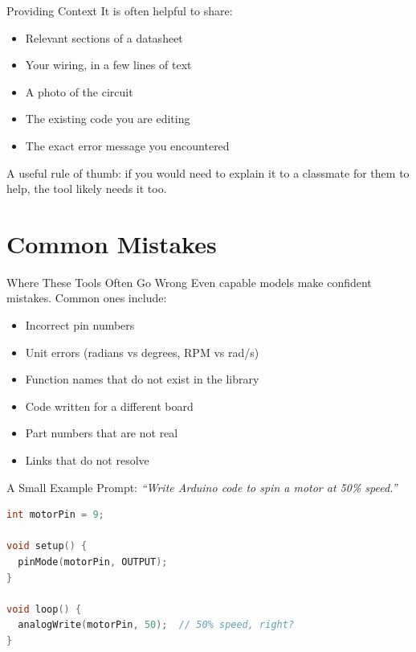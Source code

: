 \documentclass[aspectratio=169,11pt]{beamer}
\begin{document}
\begin{frame}{Providing Context}
  It is often helpful to share:
  \vfill
  \begin{itemize}
    \setlength\itemsep{0.4em}
    \item Relevant sections of a datasheet
    \item Your wiring, in a few lines of text
    \item A photo of the circuit
    \item The existing code you are editing
    \item The exact error message you encountered
  \end{itemize}
  \vfill
  A useful rule of thumb: if you would need to explain it to a classmate for them to help, the tool likely needs it too.
\end{frame}

\section{Common Mistakes}

\begin{frame}{Where These Tools Often Go Wrong}
  Even capable models make confident mistakes. Common ones include:
  \vfill
  \begin{itemize}
    \setlength\itemsep{0.4em}
    \item Incorrect pin numbers
    \item Unit errors (radians vs degrees, RPM vs rad/s)
    \item Function names that do not exist in the library
    \item Code written for a different board
    \item Part numbers that are not real
    \item Links that do not resolve
  \end{itemize}
\end{frame}

\begin{frame}[fragile]{A Small Example}
  Prompt: \itshape ``Write Arduino code to spin a motor at 50\% speed.''
  \vspace{0.5em}
  \begin{lstlisting}[language=C++]
int motorPin = 9;

void setup() {
  pinMode(motorPin, OUTPUT);
}

void loop() {
  analogWrite(motorPin, 50);  // 50% speed, right?
}
  \end{lstlisting}
\end{frame}
\end{document}
